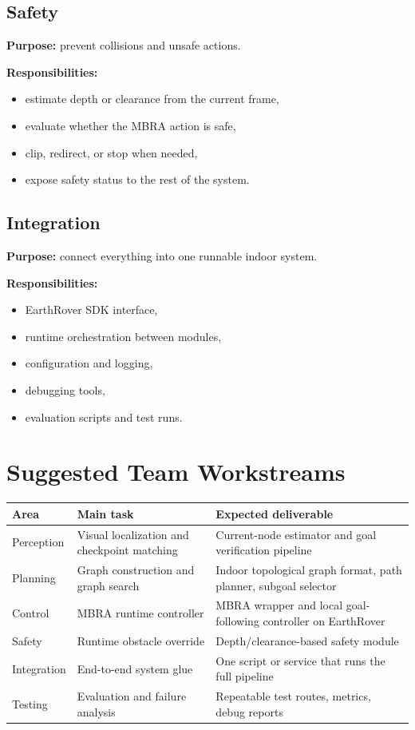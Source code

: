 \documentclass[11pt,a4paper]{article}
\begin{document}
\subsection{Safety}

\textbf{Purpose:} prevent collisions and unsafe actions.

\textbf{Responsibilities:}
\begin{itemize}[nosep]
  \item estimate depth or clearance from the current frame,
  \item evaluate whether the MBRA action is safe,
  \item clip, redirect, or stop when needed,
  \item expose safety status to the rest of the system.
\end{itemize}


\subsection{Integration}

\textbf{Purpose:} connect everything into one runnable indoor system.

\textbf{Responsibilities:}
\begin{itemize}[nosep]
  \item EarthRover SDK interface,
  \item runtime orchestration between modules,
  \item configuration and logging,
  \item debugging tools,
  \item evaluation scripts and test runs.
\end{itemize}


\section{Suggested Team Workstreams}

\begin{tabularx}{\textwidth}{p{} p{} X}
\toprule
\textbf{Area} & \textbf{Main task} & \textbf{Expected deliverable} \\
\midrule
Perception & Visual localization and checkpoint matching & Current-node estimator and goal verification pipeline \\
Planning & Graph construction and graph search & Indoor topological graph format, path planner, subgoal selector \\
Control & MBRA runtime controller & MBRA wrapper and local goal-following controller on EarthRover \\
Safety & Runtime obstacle override & Depth/clearance-based safety module \\
Integration & End-to-end system glue & One script or service that runs the full pipeline \\
Testing & Evaluation and failure analysis & Repeatable test routes, metrics, debug reports \\
\bottomrule
\end{tabularx}
\end{document}
